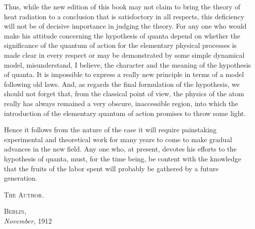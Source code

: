 \documentclass[12pt,oneside]{book}
\begin{document}
Thus, while the new edition of this book may not claim to bring the theory of heat radiation to a conclusion that is satisfoctory in all respects, this deficiency will not be of decisive importance in judging the theory. For any one who would make his attitude concerning the hypothesis of quanta depend on whether the significance of the quantum of action for the elementary physical processes is made clear in every respect or may be demonstrated by some simple dynamical model, misunderstand, I believe, the character and the meaning of the hypothesis of quanta. It is impossible to express a really new principle in terms of a model following old laws. And, as regards the final formulation of the hypothesis, we should not forget that, from the classical point of view, the physics of the atom really has always remained a very obscure, inaccessible region, into which the introduction of the elementary quantum of action promises to throw some light. \par 

Hence it follows from the nature of the case it will require painstaking experimental and theoretical work for many years to come to make gradual advances in the new field. Any one who, at present, devotes his efforts to the hypothesis of quanta, must, for the time being, be content with the knowledge that the fruits of the labor spent will probably be gathered by a future generation. \par 

\begin{flushright}
    \textsc{The Author.}
\end{flushright} \par 
\textsc{Berlin,} \\
\textit{November,} 1912
\end{document}
